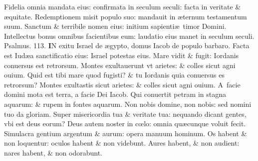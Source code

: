 \documentclass[a5paper,10pt]{book}
\def\ae{æ}
\def\oe{œ}
\begin{document}
\begin{multicols*}{2}
\newline \color{red} F\color{black}idelia omnia mandata eius: confirmata in seculum seculi: facta in veritate \& \ae quitate.
\newline \color{red} R\color{black}edemptionem misit populo suo: mandauit in \ae ternum testamentum suum.
\newline \color{red} S\color{black}anctum \& terribile nomen eius: initium sapienti\ae \ timor Domini.
\newline \color{red} I\color{black}ntellectus bonus omnibus facientibus eum: laudatio eius manet in seculum seculi. \quad \color{red} Psalmus. \hypertarget{ps113}{113.} \color{black}
\vspace{-.5em}
\lettrine[lines=2]{\bfseries \color{red} I}{}N exitu Israel de \ae gypto, domus Iacob de populo barbaro.
\newline \color{red} F\color{black}acta est Iud\ae a sanctificatio eius: Israel potestas eius.
\newline \color{red} M\color{black}are vidit \& fugit: Iordanis conuersus est retrorsum.
\newline \color{red} M\color{black}ontes exultauerunt vt arietes: \& colles sicut agni ouium.
\newline \color{red} Q\color{black}uid est tibi mare quod fugisti? \& tu Iordanis quia conuersus es retrorsum?%
\newline \color{red} M\color{black}ontes exultastis sicut arietes: \& colles sicut agni ouium.
\newline \color{red} A\color{black}\ facie domini mota est terra, a facie Dei Iacob.
\newline \color{red} Q\color{black}ui conuertit petram in stagna aquarum: \& rupem in fontes aquarum.
\newline \color{red} N\color{black}on nobis domine, non nobis: sed nomini tuo da gloriam.
\newline \color{red} S\color{black}uper misericordia tua \& veritate tua: nequando dicant gentes, vbi est deus eorum?
\newline \color{red} D\color{black}eus autem noster in c\oe lo: omnia qu\ae cunque voluit fecit.
\newline \color{red} S\color{black}imulacra gentium argentum \& aurum: opera manuum hominum.
\newline \color{red} O\color{black}s habent \& non loquentur: oculos habent \& non videbunt.
\newline \color{red} A\color{black}ures habent, \& non audient: nares habent, \& non odorabunt.

\end{multicols*}
\end{document}
